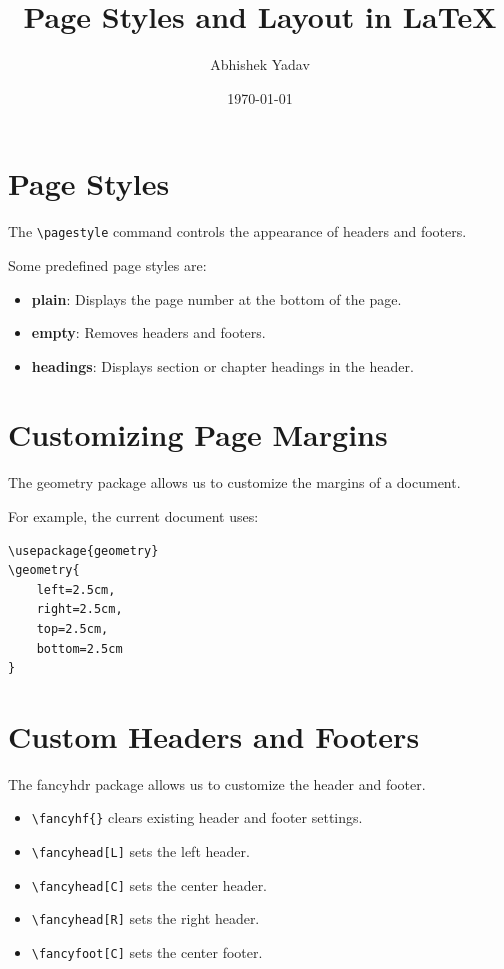 \documentclass[12pt,a4paper]{article}
\title{Page Styles and Layout in LaTeX}
\author{Abhishek Yadav}
\date{\today}
\begin{document}
\maketitle

\section{Page Styles}

The \texttt{\textbackslash pagestyle} command
controls the appearance of headers and footers.

Some predefined page styles are:

\begin{itemize}
    \item \textbf{plain}: Displays the page number
    at the bottom of the page.

    \item \textbf{empty}: Removes headers and footers.

    \item \textbf{headings}: Displays section or
    chapter headings in the header.
\end{itemize}

\section{Customizing Page Margins}

The geometry package allows us to customize
the margins of a document.

For example, the current document uses:

\begin{verbatim}
\usepackage{geometry}
\geometry{
    left=2.5cm,
    right=2.5cm,
    top=2.5cm,
    bottom=2.5cm
}
\end{verbatim}

\section{Custom Headers and Footers}

The fancyhdr package allows us to customize
the header and footer.

\begin{itemize}
    \item \texttt{\textbackslash fancyhf\{\}} clears
    existing header and footer settings.

    \item \texttt{\textbackslash fancyhead[L]}
    sets the left header.

    \item \texttt{\textbackslash fancyhead[C]}
    sets the center header.

    \item \texttt{\textbackslash fancyhead[R]}
    sets the right header.

    \item \texttt{\textbackslash fancyfoot[C]}
    sets the center footer.
\end{itemize}
\end{document}
